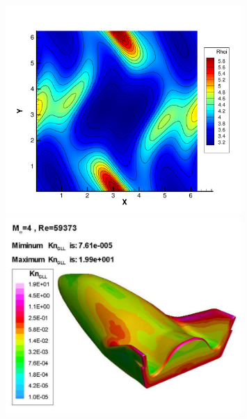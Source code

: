 \documentclass[18pt]{beamer}
\begin{document}
\begin{frame}
	\begin{figure}
		\begin{minipage}{0.45\linewidth}
			\centering
			\includegraphics[width=0.8\textwidth]{orszag-tang.pdf}
		\end{minipage}
		\hfill
		\begin{minipage}{0.45\linewidth}
			\centering
			\includegraphics[width=0.8\textwidth]{kn-shuttle.png}
		\end{minipage}
	\end{figure}

	\end{frame}
\end{document}
